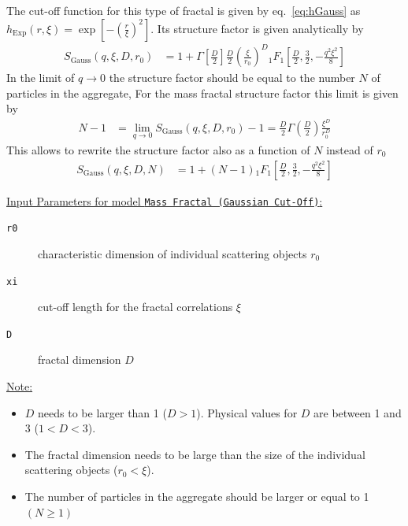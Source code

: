 The cut-off function for this type of fractal is given by eq.\ \ref{eq:hGauss} as
$h_\text{Exp}(r,\xi) = \exp\left[-\left(\tfrac{r}{\xi}\right)^2\right]$. Its structure factor is given analytically by
\begin{align}
S_\text{Gauss}(q,\xi,D,r_0) &= 1 +
    \Gamma\left[\tfrac{D}{2}\right]\frac{D}{2}
    \left(\frac{\xi}{r_0}\right)^D
    {}_1F_1\left[\tfrac{D}{2},\tfrac{3}{2},-\tfrac{q^2\xi^2}{8}\right]
\end{align}
In the limit of $q \to 0$ the structure factor should be equal to the number $N$ of particles in the aggregate, For the mass fractal structure factor this limit is given by
\begin{align}\label{eq:fractalGauss}
  N-1 & =\lim_{q\to 0}  S_\text{Gauss}(q,\xi,D,r_0)-1 = \frac{D}{2}\Gamma\left( \frac{D}{2} \right) \frac{\xi^D}{r_0^D}
\end{align}
This allows to rewrite the structure factor also as a function of $N$ instead of $r_0$
\begin{align}
S_\text{Gauss}(q,\xi,D,N) &= 1 +  (N-1) {}_1F_1\left[\tfrac{D}{2},\tfrac{3}{2},-\tfrac{q^2\xi^2}{8}\right]
\end{align}


\uline{Input Parameters for model \texttt{Mass Fractal (Gaussian Cut-Off)}:}
\begin{description}
\item[\texttt{r0}] characteristic dimension of individual scattering objects $r_0$
\item[\texttt{xi}] cut-off length for the fractal correlations $\xi$
\item[\texttt{D}] fractal dimension $D$
\end{description}

\uline{Note:}
\begin{itemize}
\item $D$ needs to be larger than 1 ($D>1$). Physical values for $D$ are between 1 and 3 ($1<D<3$).
\item The fractal dimension needs to be large than the size of the individual scattering objects ($r_0 < \xi$).
\item The number of particles in the aggregate should be larger or equal to 1 $(N\geq 1)$
\end{itemize}

